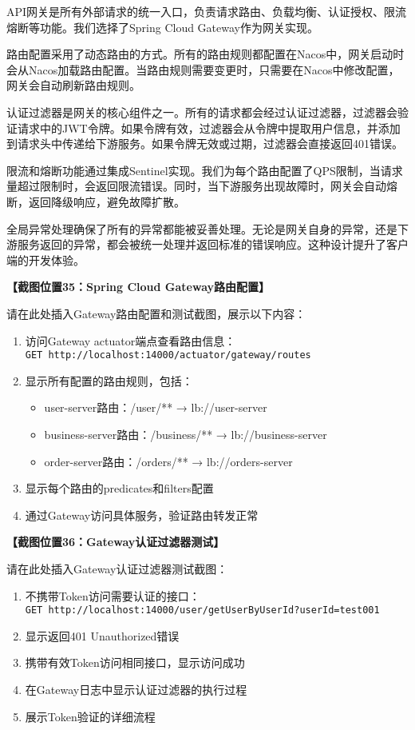 \documentclass[a4paper,12pt]{article}
\begin{document}
API网关是所有外部请求的统一入口，负责请求路由、负载均衡、认证授权、限流熔断等功能。我们选择了Spring Cloud Gateway作为网关实现。

路由配置采用了动态路由的方式。所有的路由规则都配置在Nacos中，网关启动时会从Nacos加载路由配置。当路由规则需要变更时，只需要在Nacos中修改配置，网关会自动刷新路由规则。

认证过滤器是网关的核心组件之一。所有的请求都会经过认证过滤器，过滤器会验证请求中的JWT令牌。如果令牌有效，过滤器会从令牌中提取用户信息，并添加到请求头中传递给下游服务。如果令牌无效或过期，过滤器会直接返回401错误。

限流和熔断功能通过集成Sentinel实现。我们为每个路由配置了QPS限制，当请求量超过限制时，会返回限流错误。同时，当下游服务出现故障时，网关会自动熔断，返回降级响应，避免故障扩散。

全局异常处理确保了所有的异常都能被妥善处理。无论是网关自身的异常，还是下游服务返回的异常，都会被统一处理并返回标准的错误响应。这种设计提升了客户端的开发体验。

\textbf{【截图位置35：Spring Cloud Gateway路由配置】}

请在此处插入Gateway路由配置和测试截图，展示以下内容：
\begin{enumerate}
\item 访问Gateway actuator端点查看路由信息：\\
  \texttt{GET http://localhost:14000/actuator/gateway/routes}
\item 显示所有配置的路由规则，包括：
  \begin{itemize}
    \item user-server路由：/user/** → lb://user-server
    \item business-server路由：/business/** → lb://business-server
    \item order-server路由：/orders/** → lb://orders-server
  \end{itemize}
\item 显示每个路由的predicates和filters配置
\item 通过Gateway访问具体服务，验证路由转发正常
\end{enumerate}

\textbf{【截图位置36：Gateway认证过滤器测试】}

请在此处插入Gateway认证过滤器测试截图：
\begin{enumerate}
\item 不携带Token访问需要认证的接口：\\
  \texttt{GET http://localhost:14000/user/getUserByUserId?userId=test001}
\item 显示返回401 Unauthorized错误
\item 携带有效Token访问相同接口，显示访问成功
\item 在Gateway日志中显示认证过滤器的执行过程
\item 展示Token验证的详细流程
\end{enumerate}
\end{document}
